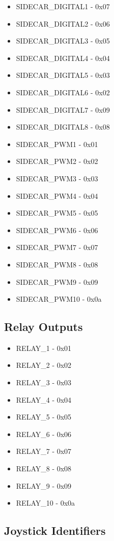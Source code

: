 \documentclass[11pt]{article} %
\begin{document}
\begin{itemize}
\item SIDECAR\_DIGITAL1 - 0x07
\item SIDECAR\_DIGITAL2 - 0x06
\item SIDECAR\_DIGITAL3 - 0x05
\item SIDECAR\_DIGITAL4 - 0x04
\item SIDECAR\_DIGITAL5 - 0x03
\item SIDECAR\_DIGITAL6 - 0x02
\item SIDECAR\_DIGITAL7 - 0x09
\item SIDECAR\_DIGITAL8 - 0x08
\item SIDECAR\_PWM1 - 0x01
\item SIDECAR\_PWM2 - 0x02
\item SIDECAR\_PWM3 - 0x03
\item SIDECAR\_PWM4 - 0x04
\item SIDECAR\_PWM5 - 0x05
\item SIDECAR\_PWM6 - 0x06
\item SIDECAR\_PWM7 - 0x07
\item SIDECAR\_PWM8 - 0x08
\item SIDECAR\_PWM9 - 0x09
\item SIDECAR\_PWM10 - 0x0a
\end{itemize}

\newpage

\subsection{Relay Outputs}

\begin{itemize}
\item RELAY\_1 - 0x01
\item RELAY\_2 - 0x02
\item RELAY\_3 - 0x03
\item RELAY\_4 - 0x04
\item RELAY\_5 - 0x05
\item RELAY\_6 - 0x06
\item RELAY\_7 - 0x07
\item RELAY\_8 - 0x08
\item RELAY\_9 - 0x09
\item RELAY\_10 - 0x0a
\end{itemize}

\newpage

\subsection{Joystick Identifiers}
\end{document}
